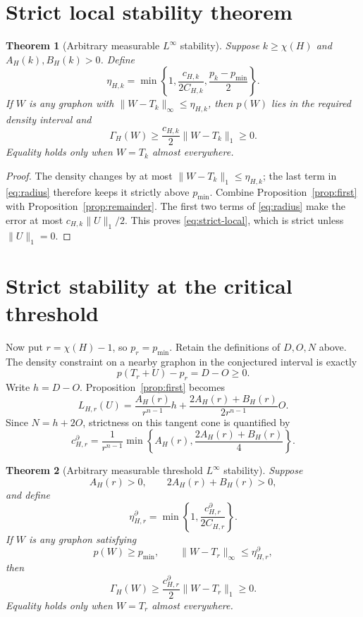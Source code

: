\documentclass[11pt]{article}
\newtheorem{theorem}{Theorem}[section]
\begin{document}
\section{Strict local stability theorem}

\begin{theorem}[Arbitrary measurable $L^\infty$ stability]
\label{thm:local}
Suppose $k\geq\chi(H)$ and $A_H(k),B_H(k)>0$.  Define
\begin{equation}
 \eta_{H,k}=\min\left\{
 1,\frac{c_{H,k}}{2C_{H,k}},
 \frac{p_k-p_{\min}}2
 \right\}.
 \label{eq:radius}
\end{equation}
If $W$ is any graphon with
$\lVert W-T_k\rVert_\infty\leq\eta_{H,k}$, then $p(W)$ lies in the required
density interval and
\begin{equation}
 \Gamma_H(W)\geq
 \frac{c_{H,k}}2\lVert W-T_k\rVert_1\geq0.
 \label{eq:strict-local}
\end{equation}
Equality holds only when $W=T_k$ almost everywhere.
\end{theorem}

\begin{proof}
The density changes by at most $\lVert W-T_k\rVert_1\leq\eta_{H,k}$; the
last term in \eqref{eq:radius} therefore keeps it strictly above
$p_{\min}$.  Combine Proposition~\ref{prop:first} with
Proposition~\ref{prop:remainder}.  The first two terms of
\eqref{eq:radius} make the error at most
$c_{H,k}\lVert U\rVert_1/2$.  This proves \eqref{eq:strict-local}, which is
strict unless $\lVert U\rVert_1=0$.
\end{proof}

\section{Strict stability at the critical threshold}

Now put $r=\chi(H)-1$, so $p_r=p_{\min}$.  Retain the definitions of
$D,O,N$ above.  The density constraint on a nearby graphon in the conjectured
interval is exactly
\[
 p(T_r+U)-p_r=D-O\geq0.
\]
Write $h=D-O$.  Proposition~\ref{prop:first} becomes
\[
 L_{H,r}(U)
 =\frac{A_H(r)}{r^{n-1}}h
 +\frac{2A_H(r)+B_H(r)}{2r^{n-1}}O.
\]
Since $N=h+2O$, strictness on this tangent cone is quantified by
\begin{equation}
 c^{\partial}_{H,r}
 =\frac1{r^{n-1}}
 \min\left\{A_H(r),\frac{2A_H(r)+B_H(r)}4\right\}.
 \label{eq:threshold-slope}
\end{equation}

\begin{theorem}[Arbitrary measurable threshold $L^\infty$ stability]
\label{thm:threshold-local}
Suppose
\[
 A_H(r)>0,\qquad 2A_H(r)+B_H(r)>0,
\]
and define
\begin{equation}
 \eta^{\partial}_{H,r}
 =\min\left\{1,\frac{c^{\partial}_{H,r}}{2C_{H,r}}\right\}.
 \label{eq:threshold-radius}
\end{equation}
If $W$ is any graphon satisfying
\[
 p(W)\geq p_{\min},\qquad
 \lVert W-T_r\rVert_\infty\leq\eta^{\partial}_{H,r},
\]
then
\[
 \Gamma_H(W)\geq
 \frac{c^{\partial}_{H,r}}2\lVert W-T_r\rVert_1\geq0.
\]
Equality holds only when $W=T_r$ almost everywhere.
\end{theorem}
\end{document}
